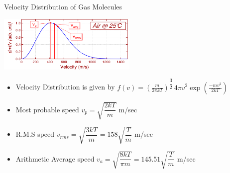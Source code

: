 \documentclass[11]{beamer}
\begin{document}
\begin{frame}{Velocity Distribution of Gas Molecules}

\begin{center}
\includegraphics[width=0.5\textwidth]{MaxwellDistributionCurve.png}
\end{center}

	\begin{exampleblock}

       \begin{itemize}
       \item Velocity Distribution is given by $f(v) = \left(\frac{m}{2 \pi kT}\right)^{\dfrac{3}{2}}\, 4\pi v^2 \exp \left(\frac{-mv^2}{2kT}\right)$
       \item Most probable speed $v_p =\sqrt{\dfrac{2kT}{m}}$ m/sec
        \item R.M.S speed $v_{rms} =\sqrt{\dfrac{3kT}{m}}=158\sqrt{\dfrac{T}{m}}$ m/sec
        \item Arithmetic Average speed $v_{a} =\sqrt{\dfrac{8kT}{\pi m}}=145.51\sqrt{\dfrac{T}{m}}$ m/sec
        
       \end{itemize}


	\end{exampleblock}

\end{frame}
\end{document}

